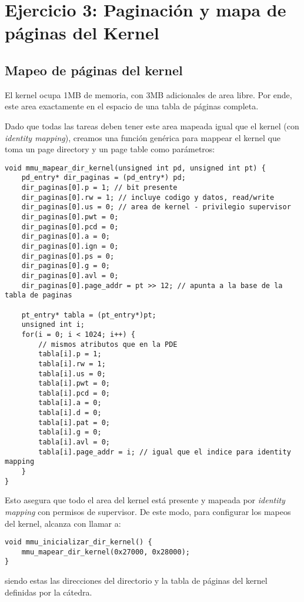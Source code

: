 \section{Ejercicio 3: Paginación y mapa de páginas del Kernel}

	\subsection{Mapeo de páginas del kernel}

	El kernel ocupa 1MB de memoria, con 3MB adicionales de area libre. Por ende, este area exactamente en el espacio de una tabla de páginas completa.

	Dado que todas las tareas deben tener este area mapeada igual que el kernel (con \textit{identity mapping}), creamos una función genérica para mappear el kernel que toma un page directory y un page table como parámetros:


	\lstset{escapechar=@,style=c}
	\begin{lstlisting}
void mmu_mapear_dir_kernel(unsigned int pd, unsigned int pt) {
	pd_entry* dir_paginas = (pd_entry*) pd;
	dir_paginas[0].p = 1; // bit presente
	dir_paginas[0].rw = 1; // incluye codigo y datos, read/write
	dir_paginas[0].us = 0; // area de kernel - privilegio supervisor
	dir_paginas[0].pwt = 0;
	dir_paginas[0].pcd = 0;
	dir_paginas[0].a = 0;
	dir_paginas[0].ign = 0;
	dir_paginas[0].ps = 0;
	dir_paginas[0].g = 0;
	dir_paginas[0].avl = 0;
	dir_paginas[0].page_addr = pt >> 12; // apunta a la base de la tabla de paginas

	pt_entry* tabla = (pt_entry*)pt;
	unsigned int i;
	for(i = 0; i < 1024; i++) {
		// mismos atributos que en la PDE
		tabla[i].p = 1;
		tabla[i].rw = 1;
		tabla[i].us = 0;
		tabla[i].pwt = 0;
		tabla[i].pcd = 0;
		tabla[i].a = 0;
		tabla[i].d = 0;
		tabla[i].pat = 0;
		tabla[i].g = 0;
		tabla[i].avl = 0;
		tabla[i].page_addr = i; // igual que el indice para identity mapping
	}
}
	\end{lstlisting}

	Esto asegura que todo el area del kernel está presente y mapeada por \textit{identity mapping} con permisos de supervisor. De este modo, para configurar los mapeos del kernel, alcanza con llamar a:

	\begin{lstlisting}
void mmu_inicializar_dir_kernel() {
	mmu_mapear_dir_kernel(0x27000, 0x28000);
}
	\end{lstlisting}

	siendo estas las direcciones del directorio y la tabla de páginas del kernel definidas por la cátedra.

